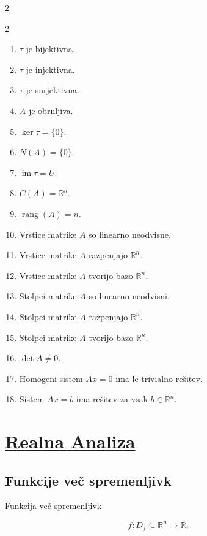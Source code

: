 \documentclass{article}
\begin{document}
\begin{multicols}{2}
	\begin{small}
		\begin{multicols}{2}
			\begin{enumerate}[label=(\arabic*), leftmargin=*, itemsep=0.2ex, topsep=0.2ex, parsep=0pt]
				\item \(\tau\) je bijektivna.
				\item \(\tau\) je injektivna.
				\item \(\tau\) je surjektivna.
				\item \(A\) je obrnljiva.
				\item \(\ker \tau=\{0\}\).
				\item \(N(A)=\{0\}\).
				\item \(\operatorname{im}\tau=U\).
				\item \(C(A)=\mathbb{R}^n\).
				\item \(\operatorname{rang}(A)=n\).
				\item Vrstice matrike \(A\) so linearno neodvisne.
				\item Vrstice matrike \(A\) razpenjajo \(\mathbb{R}^n\).
				\item Vrstice matrike \(A\) tvorijo bazo \(\mathbb{R}^n\).
				\item Stolpci matrike \(A\) so linearno neodvisni.
				\item Stolpci matrike \(A\) razpenjajo \(\mathbb{R}^n\).
				\item Stolpci matrike \(A\) tvorijo bazo \(\mathbb{R}^n\).
				\item \(\det A\neq 0\).
				\item Homogeni sistem \(Ax=0\) ima le trivialno rešitev.
				\item Sistem \(Ax=b\) ima rešitev za vsak \(b\in\mathbb{R}^n\).
			\end{enumerate}
		\end{multicols}
	\end{small}

	\section{\underline{Realna Analiza}}

	\subsection{Funkcije več spremenljivk}
	Funkcija več spremenljivk

	\[
		f : D_f \subseteq \mathbb{R}^n \to \mathbb{R},
	\]


\end{multicols}
\end{document}
